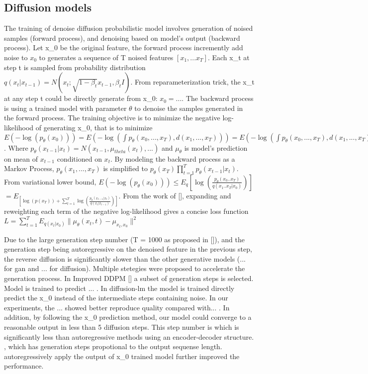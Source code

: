 \documentclass{article}
\begin{document}
\subsection{Diffusion models}
The training of denoise diffusion probabilistic model involves generation of noised samples (forward process), and denoising based on model's output (backward process). Let x_0 be the original feature, the forward process incremently add noise to $x_0$ to generates a sequence of T noised features $[x_1, ... x_T]$. Each x_t at step t is sampled from probability distribution $q(x_t | x_{t-1}) = N(x_t; \sqrt{1 - \beta_t}x_{t-1}, \beta_t I)$. From reparameterization trick, the x_t at any step t could be directly generate from x_0: $x_0 = ...$. The backward process is using a trained model with parameter $\theta$ to denoise the samples generated in the forward process. The training objective is to minimize the negative log-likelihood of generating x_0, that is to minimize $E(-\log(p_{\theta}(x_0))) = E(-\log(\int p_{\theta}(x_0, ..., x_T), d(x_1, ..., x_T))) = E(-\log(\int p_{\theta}(x_0, ..., x_T), d(x_1, ..., x_T)))$. Where $p_{\theta}(x_{t-1} | x_t) = N(x_{t-1}, \mu_{theta}(x_t), ...)$ and $\mu_{\theta}$ is model's prediction on mean of $x_{t-1}$ conditioned on $x_t$. By modeling the backward process as a Markov Process, $p_{\theta}(x_1, ..., x_T)$ is simplified to $p_{\theta}(x_T) \prod_{t=1}^T p_{\theta}(x_{t-1} | x_t)$. From variational lower bound, $E(-\log(p_{\theta}(x_0))) \leq E_q[\log(\frac{p_{\theta}(x_0..x_T)}{q(x_1..x_T| x_0)})]$ $= E_[\log(p(x_T)) + \sum_{t = 1}^T\log(\frac{p_{\theta}(x_{t-1} | x_t)}{q(x_t | x_{t-1})})]$. From the work of [], expanding and reweighting each term of the negative log-likelihood gives a concise loss function $L = \sum_{t=1}^T E_{q(x_t | x_0)} \|\mu_{\theta}(x_t, t) - \mu_{x_t, x_0}\|^2$

Due to the large generation step number (T = 1000 as proposed in []), and the generation step being autoregressive on the denoised feature in the previous step, the reverse diffusion is significantly slower than the other generative models (... for gan and ... for diffusion). Multiple stetegies were proposed to accelerate the generation process. In Improved DDPM [] a subset of generation steps is selected. Model is trained to predict ... . In diffusion-lm the model is trained directly predict the x_0 instead of the intermediate steps containing noise. In our experiments, the ... showed better reproduce quality compared with... {}. In addition, by following the x_0 prediction method, our model could converge to a reasonable output in less than 5 diffusion steps. This step number is which is significantly less than autoregressive methods using an encoder-decoder structure. , which has generation steps propotional to the output sequense length. autoregressively apply the output of x_0 trained model further improved the performance. {}
\end{document}
